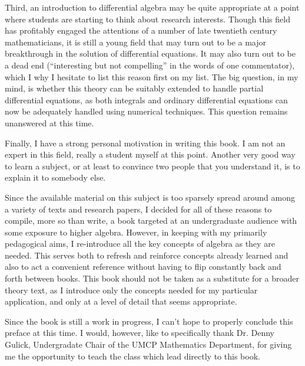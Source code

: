 Third, an introduction to differential algebra may be quite
appropriate at a point where students are starting to think about
research interests.  Though this field has profitably engaged the
attentions of a number of late twentieth century mathematicians, it is
still a young field that may turn out to be a major breakthrough in
the solution of differential equations.  It may also turn out to be a
dead end (``interesting but not compelling'' in the words of one
commentator), which I why I hesitate to list this reason first on my
list.  The big question, in my mind, is whether this theory can be
suitably extended to handle partial differential equations, as both
integrals and ordinary differential equations can now be adequately
handled using numerical techniques.  This question remains unanswered
at this time.

Finally, I have a strong personal motivation in writing this book.
I am not an expert in this field, really a student myself at this
point.  Another very good way to learn a subject, or at least to
convince two people that you understand it, is to explain it to
somebody else.

Since the available material on this subject is too sparsely spread
around among a variety of texts and research papers, I decided for all
of these reasons to compile, more so than write, a book targeted at an
undergraduate audience with some exposure to higher algebra.  However,
in keeping with my primarily pedagogical aims, I re-introduce all the
key concepts of algebra as they are needed.  This serves both to
refresh and reinforce concepts already learned and also to act a
convenient reference without having to flip constantly back and forth
between books.  This book should not be taken as a substitute for a
broader theory text, as I introduce only the concepts needed for my
particular application, and only at a level of detail that seems
appropriate.

Since the book is still a work in progress, I can't hope to
properly conclude this preface at this time.  I would,
however, like to specifically thank Dr. Denny Gulick, Undergradate
Chair of the UMCP Mathematics Department, for giving me
the opportunity to teach the class which lead directly
to this book.
